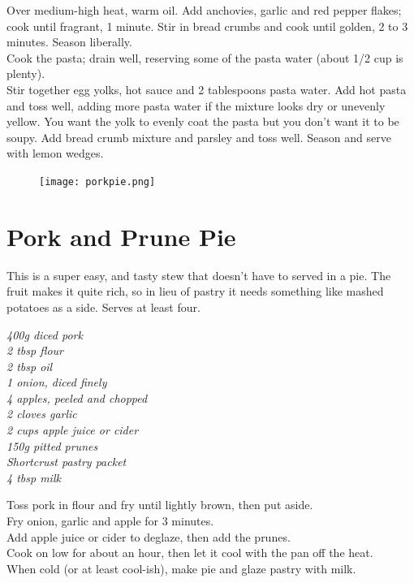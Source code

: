 \documentclass{tufte-book}
\begin{document}
\smallskip
Over medium-high heat, warm oil. Add anchovies, garlic and red pepper flakes; cook until fragrant, 1 minute. Stir in bread crumbs and cook until golden, 2 to 3 minutes. Season liberally.
\\Cook the pasta; drain well, reserving some of the pasta water (about 1/2 cup is plenty). 
\\Stir together egg yolks, hot sauce and 2 tablespoons pasta water. Add hot pasta and toss well, adding more pasta water if the mixture looks dry or unevenly yellow. You want the yolk to evenly coat the pasta but you don't want it to be soupy. Add bread crumb mixture and parsley and toss well. Season and serve with lemon wedges.


\newpage

\begin{figure}[h]
  \texttt{[image: porkpie.png]}
\end{figure}

\section{Pork and Prune Pie}

This is a super easy, and tasty stew that doesn't have to served in a pie. The fruit makes it quite rich, so in lieu of pastry it needs something like mashed potatoes as a side. Serves at least four.

\smallskip
\emph{400g diced pork
\\2 tbsp flour
\\2 tbsp oil
\\1 onion, diced finely
\\4 apples, peeled and chopped
\\2 cloves garlic
\\2 cups apple juice or cider
\\150g pitted prunes
\\Shortcrust pastry packet
\\4 tbsp milk}

\smallskip
Toss pork in flour and fry until lightly brown, then put aside.
\\Fry onion, garlic and apple for 3 minutes.
\\Add apple juice or cider to deglaze, then add the prunes.
\\Cook on low for about an hour, then let it cool with the pan off the heat.
\\When cold (or at least cool-ish), make pie and glaze pastry with milk.
\end{document}
